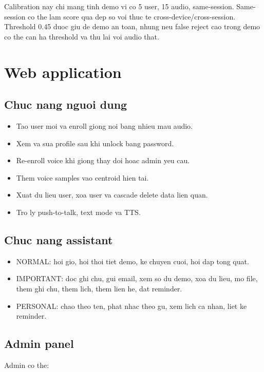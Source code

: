 \documentclass[12pt,a4paper]{article}
\begin{document}
Calibration nay chi mang tinh demo vi co 5 user, 15 audio, same-session. Same-session
co the lam score qua dep so voi thuc te cross-device/cross-session. Threshold
0.45 duoc giu de demo an toan, nhung neu false reject cao trong demo co the can
ha threshold va thu lai voi audio that.

\section{Web application}

\subsection{Chuc nang nguoi dung}

\begin{itemize}
  \item Tao user moi va enroll giong noi bang nhieu mau audio.
  \item Xem va sua profile sau khi unlock bang password.
  \item Re-enroll voice khi giong thay doi hoac admin yeu cau.
  \item Them voice samples vao centroid hien tai.
  \item Xuat du lieu user, xoa user va cascade delete data lien quan.
  \item Tro ly push-to-talk, text mode va TTS.
\end{itemize}

\subsection{Chuc nang assistant}

\begin{itemize}
  \item NORMAL: hoi gio, hoi thoi tiet demo, ke chuyen cuoi, hoi dap tong quat.
  \item IMPORTANT: doc ghi chu, gui email, xem so du demo, xoa du lieu, mo file, them ghi chu, them lich, them lien he, dat reminder.
  \item PERSONAL: chao theo ten, phat nhac theo gu, xem lich ca nhan, liet ke reminder.
\end{itemize}

\subsection{Admin panel}

Admin co the:
\end{document}
